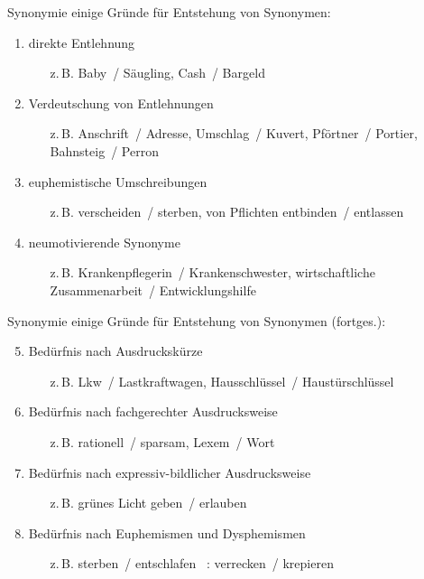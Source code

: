 \begin{frame}{Synonymie}
\onslide<+->
einige Gründe für Entstehung von Synonymen:
\begin{enumerate}[<+->]
	\item		direkte Entlehnung
	\begin{itemize}
		\item[z.\,B.]	Baby~/ Säugling, Cash~/ Bargeld
	\end{itemize}
	\item		Verdeutschung von Entlehnungen
	\begin{itemize}
		\item[z.\,B.]	Anschrift~/ Adresse, Umschlag~/ Kuvert, Pförtner~/ Portier, Bahnsteig~/ Perron
	\end{itemize}
	\item		euphemistische Umschreibungen
	\begin{itemize}
		\item[z.\,B.]	verscheiden~/ sterben, von Pflichten entbinden~/ entlassen
	\end{itemize}
	\item		neumotivierende Synonyme
	\begin{itemize}
		\item[z.\,B.]	Krankenpflegerin~/ Krankenschwester, wirtschaftliche Zusammenarbeit~/ Entwicklungshilfe
	\end{itemize}
\end{enumerate}
\end{frame}

\begin{frame}{Synonymie}
\onslide<+->
einige Gründe für Entstehung von Synonymen (fortges.):
\begin{enumerate}[<+->]\setcounter{enumi}{4}
	\item		Bedürfnis nach Ausdruckskürze
	\begin{itemize}
		\item[z.\,B.]	Lkw~/ Lastkraftwagen, Hausschlüssel~/ Haustürschlüssel
	\end{itemize}
	\item		Bedürfnis nach fachgerechter Ausdrucksweise
	\begin{itemize}
		\item[z.\,B.]	rationell~/ sparsam, Lexem~/ Wort
	\end{itemize}
	\item		Bedürfnis nach expressiv-bildlicher Ausdrucksweise
	\begin{itemize}
		\item[z.\,B.]	grünes Licht geben~/ erlauben
	\end{itemize}
	\item		Bedürfnis nach Euphemismen und Dysphemismen
	\begin{itemize}
		\item[z.\,B.]	sterben~/ entschlafen ~: verrecken~/ krepieren
	\end{itemize}
\end{enumerate}
\end{frame}

